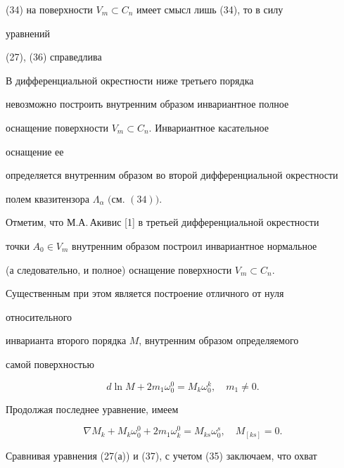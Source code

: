 (34) на поверхности $V_m\subset C_n$ имеет смысл лишь (34), то в силу 


уравнений 


(27), (36) справедлива 


 


\begin{thm} 


В дифференциальной окрестности ниже третьего порядка 


невозможно построить внутренним образом инвариантное полное 


оснащение поверхности $V_m\subset C_n$. Инвариантное касательное 


оснащение ее 


определяется внутренним образом во второй дифференциальной окрестности 


полем квазитензора $\Lambda_\alpha$ $($см. $(34))$. 


\end{thm} 


 


Отметим, что М.А.\,Акивис [1] в третьей дифференциальной окрестности 


точки $A_0\in V_m$ внутренним образом построил инвариантное нормальное 


(а следовательно, и полное) оснащение поверхности $V_m\subset C_n$. 


Существенным при этом является построение отличного от нуля 


относительного 


инварианта второго порядка $M$, внутренним образом определяемого 


самой поверхностью 


\begin{equation} 


d\ln M+2m_1\omega^0_0=M_k\omega^k_0,\quad m_1\ne0. 


\end{equation} 


Продолжая последнее уравнение, имеем 


\begin{equation} 


\nabla M_k+M_k\omega^0_0+2m_1\omega^0_k=M_{k s}\omega^s_0,\quad 


M_{[k s]}=0. 


\end{equation} 


Сравнивая уравнения (27(а)) и (37), с учетом (35) заключаем, что охват 


